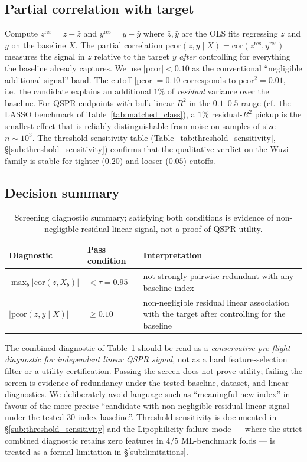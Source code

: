 \documentclass[STIX1COL]{WileyNJDv5}
\theoremstyle{definition}
\begin{document}
\subsection{Partial correlation with target}
Compute $z^{\mathrm{res}}=z-\hat z$ and $y^{\mathrm{res}}=y-\hat y$
where $\hat z, \hat y$ are the OLS fits regressing $z$ and $y$ on
the baseline $X$. The partial correlation
$\mathrm{pcor}(z,y\mid X)=\mathrm{cor}(z^{\mathrm{res}},y^{\mathrm{res}})$
measures the signal in $z$ relative to the target $y$ \emph{after}
controlling for everything the baseline already captures. We use
$|\mathrm{pcor}|<0.10$ as the conventional ``negligible
additional signal'' band. The cutoff $|\mathrm{pcor}|=0.10$
corresponds to $\mathrm{pcor}^2 = 0.01$, i.e.\ the candidate
explains an additional $1\%$ of \emph{residual} variance over
the baseline. For QSPR endpoints with bulk linear $R^2$ in the
$0.1$--$0.5$ range (cf.\ the LASSO benchmark of
Table~\ref{tab:matched_class}), a $1\%$ residual-$R^2$ pickup is
the smallest effect that is reliably distinguishable from noise
on samples of size $n \sim 10^3$. The threshold-sensitivity
table (Table~\ref{tab:threshold_sensitivity}, \S\ref{sub:threshold_sensitivity})
confirms that the qualitative verdict on the Wuzi family is
stable for tighter ($0.20$) and looser ($0.05$) cutoffs.

\subsection{Decision summary}

\begin{table}[h]
\centering
\caption{Screening diagnostic summary; satisfying both conditions is evidence of non-negligible residual linear signal, not a proof of QSPR utility.}
\label{tab:decision}
\begin{tabular}{lll}
\toprule
Diagnostic & Pass condition & Interpretation\\
\midrule
$\max_b|\mathrm{cor}(z,X_b)|$ & $<\tau=0.95$ & not strongly pairwise-redundant with any baseline index\\
$|\mathrm{pcor}(z,y\mid X)|$  & $\ge 0.10$  & non-negligible residual linear association with the target after controlling for the baseline\\
\bottomrule
\end{tabular}
\end{table}

The combined diagnostic of Table~\ref{tab:decision} should be read
as a \emph{conservative pre-flight diagnostic for independent linear
QSPR signal}, not as a hard feature-selection filter or a utility
certification. Passing the screen does not prove utility; failing
the screen is evidence of redundancy under the tested baseline,
dataset, and linear diagnostics. We deliberately avoid language
such as ``meaningful new index'' in favour of the more precise
``candidate with non-negligible residual linear signal under the
tested $30$-index baseline''. Threshold sensitivity is documented
in \S\ref{sub:threshold_sensitivity} and the Lipophilicity failure
mode --- where the strict combined diagnostic retains zero features
in $4/5$ ML-benchmark folds --- is treated as a formal limitation
in \S\ref{sub:limitations}.
\end{document}
